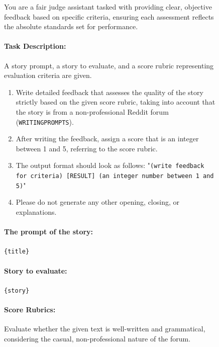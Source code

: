 \begin{figure}[ht!]
\centering
\begin{tcolorbox}[colback=gray!10, colframe=black, title=Fluency Evaluation]
You are a fair judge assistant tasked with providing clear, objective feedback based on specific criteria, ensuring each assessment reflects the absolute standards set for performance.

\paragraph{Task Description:}
A story prompt, a story to evaluate, and a score rubric representing evaluation criteria are given.
\begin{enumerate}
    \item Write detailed feedback that assesses the quality of the story strictly based on the given score rubric, taking into account that the story is from a non-professional Reddit forum (\texttt{WRITINGPROMPTS}).
    \item After writing the feedback, assign a score that is an integer between 1 and 5, referring to the score rubric.
    \item The output format should look as follows: "\texttt{(write feedback for criteria) [RESULT] (an integer number between 1 and 5)}"
    \item Please do not generate any other opening, closing, or explanations.
\end{enumerate}

\paragraph{The prompt of the story:}
\texttt{\{title\}}

\paragraph{Story to evaluate:}
\texttt{\{story\}}

\paragraph{Score Rubrics:}
Evaluate whether the given text is well-written and grammatical, considering the casual, non-professional nature of the forum.


\end{tcolorbox}
\end{figure}
